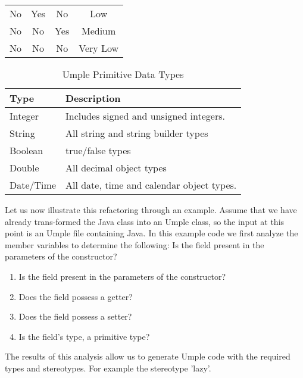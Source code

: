 \begin{table}[h]
\begin{tabular}{@{}cccc@{}}
No                                                      & Yes                                                & No                                                 & Low                                                                                                           \\
No                                                      & No                                                 & Yes                                                & Medium                                                                                                        \\
No                                                      & No                                                 & No                                                 & Very Low                                                                                                      \\ \bottomrule
\end{tabular}
\end{table}



\begin{table}
\caption{Umple Primitive Data Types}
\label{table:attributes2}
\centering
    \begin{tabular}{ll}
		\toprule
		\rowcolor[HTML]{BBDAFF}
        \textbf{Type}      & \textbf{Description}                               \\ 
        \hline
        Integer   & Includes signed and unsigned integers.    \\ 
        String    & All string and string builder types       \\ 
        Boolean   & true/false types                          \\ 
        Double    & All decimal object types                  \\ 
        Date/Time & All date, time and calendar object types. \\
        \hline
    \end{tabular}
\end{table}


Let us now illustrate this refactoring through an example. Assume that we have already trans-formed the Java class into an Umple class, so the input at this point is an Umple file containing Java. 
In this example code we first analyze the member variables to determine the following: 
Is the field present in the parameters of the constructor?
\begin{enumerate}
\item Is the field present in the parameters of the constructor?
\item Does the field possess a getter?
\item Does the field possess a setter?
\item Is the field's type, a primitive type?
\end{enumerate}
The results of this analysis allow us to generate Umple code with the required types and stereotypes. For example the stereotype 'lazy'.

